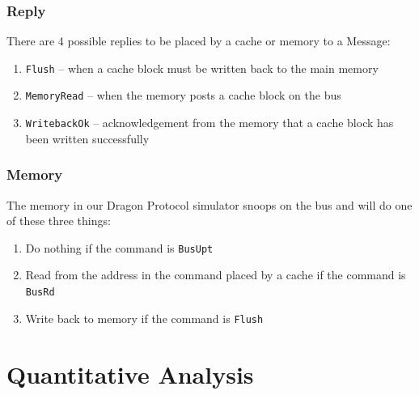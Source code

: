 \documentclass[nonacm,acmsmall,screen,11pt]{acmart}
\begin{document}
\subsubsection{Reply}
There are 4 possible replies to be placed by a cache or memory to a Message:
\begin{enumerate}
  \item \texttt{Flush} -- when a cache block must be written back to the main memory
  \item \texttt{MemoryRead} -- when the memory posts a cache block on the bus
  \item \texttt{WritebackOk} -- acknowledgement from the memory that a cache block has been written successfully
\end{enumerate}

\subsubsection{Memory}
The memory in our Dragon Protocol simulator snoops on the bus and will do one of these three things:
\begin{enumerate}
  \item Do nothing if the command is \texttt{BusUpt}
  \item Read from the address in the command placed by a cache if the command is \texttt{BusRd}
  \item Write back to memory if the command is \texttt{Flush}
\end{enumerate}

\clearpage
\section{Quantitative Analysis}
\end{document}
